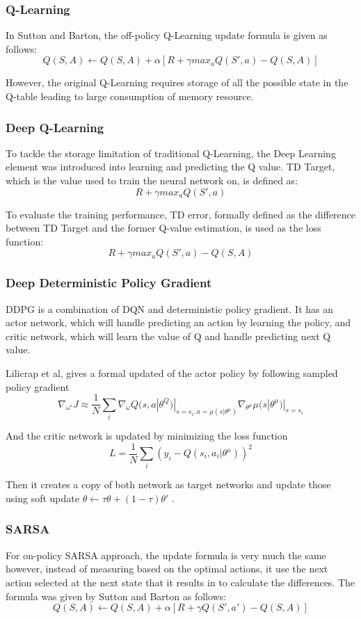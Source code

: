 \documentclass{article}
\begin{document}
\subsubsection{Q-Learning}
In Sutton and Barton\cite{sutton-barton-rl}, the off-policy Q-Learning update formula is given as follows:
\[
Q(S,A)\leftarrow Q(S,A) + \alpha[R+\gamma max_a Q(S',a) - Q(S,A)]
\]

However, the original Q-Learning requires storage of all the possible state in the Q-table leading to large consumption of memory resource. 
\subsubsection{Deep Q-Learning}
To tackle the storage limitation of traditional Q-Learning, the Deep Learning element was introduced into learning and predicting the Q value. TD Target, which is the value used to train the neural network on, is defined as:
\[
R+\gamma max_a Q(S',a)
\]

To evaluate the training performance, TD error, formally defined as the difference between TD Target and the former Q-value estimation, is used as the loss function:
\[
R+\gamma max_a Q(S',a) - Q(S,A)
\]
\subsubsection{Deep Deterministic Policy Gradient}
DDPG is a combination of DQN and deterministic policy gradient. It has an actor
network, which will handle predicting an action by learning the policy, and
critic network, which will learn the value of Q and handle predicting next Q
value\cite{lillicrap2015continuous}. 

Lilicrap et al, gives a formal updated of the actor policy by following sampled policy gradient \cite{lillicrap2015continuous}
\[
  \nabla_{\omega'} J \approx \frac{1}{N} \sum_i \nabla_{\omega} Q(s,
  a|\theta^Q)|_{s=s_i,a=\mu(s|\theta^{\mu})} \nabla_{\theta^{\mu}}
  \mu(s|\theta^{\mu})|_{s=s_i}
\]

And the critic network is updated by minimizing the loss function
\cite{lillicrap2015continuous}
\[
  L = \frac{1}{N}\sum_i(y_i - Q(s_i, a_i|\theta^{\mu}))^2
\]

Then it creates a copy of both network as target networks and update those
using soft update $\theta \leftarrow \tau \theta +
(1-\tau)\theta'$ \cite{lillicrap2015continuous}.

\subsubsection{SARSA}
For on-policy SARSA approach, the update formula is very much the same however, instead of measuring based on the optimal actions, it use the next action selected at the next state that it results in to calculate the differences. The formula was given by Sutton and Barton \cite{sutton-barton-rl} as follows:
\[
Q(S,A)\leftarrow Q(S,A) + \alpha[R+ \gamma Q(S',a') - Q(S,A)]
\]
\end{document}
